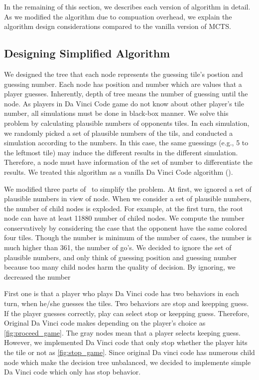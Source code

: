 In the remaining of this section, we describes each version of algorithm in detail. 
As we modified the algorithm due to compuation overhead, we explain the algorithm design considerations compared to the vanilla version of MCTS.

\subsection{Designing Simplified Algorithm}

We designed the tree that each node represents the guessing tile's postion and guessing number.
Each node has position and number which are values that a player guesses.
Inherently, depth of tree means the number of guessing until the node.
As players in Da Vinci Code game do not know about other player's tile number, all simulations must be done in black-box manner.
We solve this problem by calculating plausible numbers of opponents tiles.
In each simulation, we randomly picked a set of plausible numbers of the tils, and conducted a simulation according to the numbers.
In this case, the same guessings (e.g., 5 to the leftmost tile) may induce the different results in the different simulation.
Therefore, a node must have information of the set of number to differentiate the results.
We treated this algorithm as a vanilla Da Vinci Code algorithm (\md).



We modified three parts of \md~to simplify the problem.
At first, we ignored a set of plausible numbers in view of node.
When we consider a set of plausible numbers, the number of child nodes is exploded.
For example, at the first turn, the root node can have at least 11880 number of chiled nodes.
We compute the number conservatively by considering the case that the opponent have the same colored four tiles.
Though the number is minimum of the number of cases, the number is much higher than 361, the number of go's.
We decided to ignore the set of plausible numbers, and only think of guessing position and guessing number because too many child nodes harm the quality of decision.
By ignoring, we decreased the number

First one is that a player who plays Da Vinci code has two behaviors in each turn, when he/she guesses the tiles. 
Two behaviors are stop and keepping guess.
If the player guesses correctly, play can select stop or keepping guess. 
Therefore, Original Da Vinci code makes depending on the player's choice as \cref{fig:proceed_game}.
The gray nodes mean that a player selects keeping guess. 
However, we implemented Da Vinci code that only stop whether the player hits the tile or not as \cref{fig:stop_game}. 
Since original Da vinci code has numerous child node which make the decision tree unbalanced, we decided to implemente simple Da Vinci code which only has stop behavior.
 
